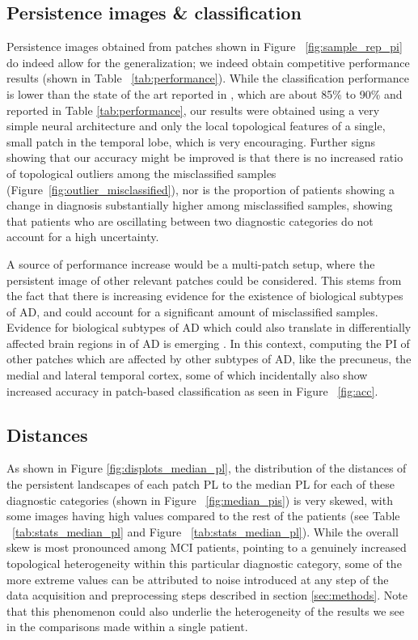 \documentclass{article}
\begin{document}
\subsection{Persistence images \& classification}

Persistence images obtained from patches shown in Figure ~\ref{fig:sample_rep_pi} do indeed allow for the generalization; we indeed obtain competitive performance results (shown in Table ~\ref{tab:performance}). While the classification performance is lower than the state of the art reported in \citep{wen2020convolutional}, which are about 85\% to 90\% and reported in Table \ref{tab:performance}, our results were obtained using a very simple neural architecture and only the local topological features of a single, small patch in the temporal lobe, which is very encouraging. Further signs showing that our accuracy might be improved is that there is no increased ratio of topological outliers among the misclassified samples (Figure~\ref{fig:outlier_misclassified}), nor is the proportion of patients showing a change in diagnosis substantially higher among misclassified samples, showing that patients who are oscillating between two diagnostic categories do not account for a high uncertainty.

A source of performance increase would be a multi-patch setup, where the persistent image of other relevant patches could be considered. This stems from the fact that there is increasing evidence for the existence of biological subtypes of AD, and could account for a significant amount of misclassified samples. Evidence for biological subtypes of AD which could also translate in differentially affected brain regions in of AD is emerging \citep{tijms2020pathophysiological,poulakis2018heterogeneous}. In this context, computing the PI of other patches which are affected by other subtypes of AD, like the precuneus, the medial and lateral temporal cortex, some of which incidentally also show increased accuracy in patch-based classification as seen in Figure ~\ref{fig:acc}.

\subsection{Distances}\label{sec:disc-dist}

As shown in Figure \ref{fig:displots_median_pl}, the distribution of the distances of the persistent landscapes of each patch PL to the median PL for each of these diagnostic categories (shown in Figure ~\ref{fig:median_pis}) is very skewed, with some images having high values compared to the rest of the patients (see Table ~\ref{tab:stats_median_pl} and Figure ~\ref{tab:stats_median_pl}). While the overall skew is most pronounced among MCI patients, pointing to a genuinely increased topological heterogeneity within this particular diagnostic category, some of the more extreme values can be attributed to noise introduced at any step of the data acquisition and preprocessing steps described in section \ref{sec:methods}. Note that this phenomenon could also underlie the heterogeneity of the results we see in the comparisons made within a single patient.
\end{document}
